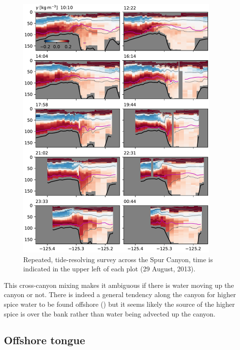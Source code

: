 \documentclass[draft]{agujournal2019}
\begin{document}
\begin{figure}[htbp]
  \begin{center}
    \includegraphics[width=4in]{HydraulicsCanyon}
    \caption{Repeated, tide-resolving survey across the Spur Canyon, time is indicated in the upper left of each plot (29 August, 2013).
      \label{fig:HydraulicsCanyon}
    }
  \end{center}
\end{figure}

This cross-canyon mixing makes it ambiguous if there is water moving up the canyon or not.  There is indeed a general tendency along the canyon for higher spice water to be found offshore () but it seems likely the source of the higher spice is over the bank rather than water being advected up the canyon.

\subsection{Offshore tongue}
\end{document}

